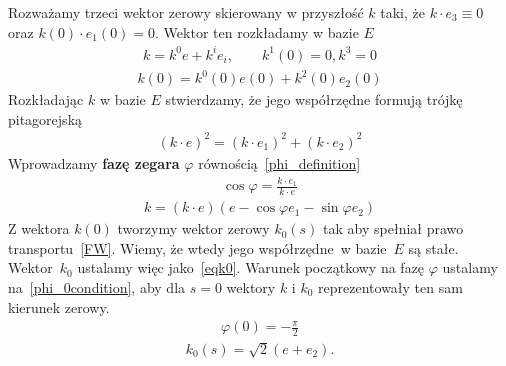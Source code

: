 Rozważamy trzeci wektor zerowy skierowany w przyszłość $k$ taki, 
że $k\cdot e_3 \equiv 0$ oraz $k(0)\cdot e_1(0) =0$.  
Wektor ten rozkładamy w bazie $E$
\begin{align*}
k = k^0 e +  k^i e_i, \qquad k^1(0)=0, k^3 = 0
\end{align*}
\begin{align*}
k(0) = k^0(0) e(0) + k^2(0) e_2(0) 
\end{align*}
Rozkładając $k$ w bazie $E$ stwierdzamy, że jego współrzędne 
formują trójkę pitagorejską 
\begin{align}
(k \cdot e)^2 = (k \cdot e_1)^2 +  (k \cdot e_2)^2
\end{align}
Wprowadzamy \textbf{fazę zegara} $\varphi$ 
równością~\eqref{phi_definition}
\begin{align}\label{phi_definition}
\cos\varphi = \frac{k\cdot e_1}{k\cdot e} 
\end{align}
\begin{align*}
k = (k\cdot e) (e -\cos\varphi e_1 - \sin\varphi e_2 )
\end{align*}
Z wektora $k(0)$ tworzymy wektor zerowy $k_0(s)$ tak aby spełniał 
prawo transportu~\eqref{FW}. Wiemy, że wtedy jego współrzędne~w 
bazie~$E$ są stałe. Wektor~$k_0$ ustalamy więc jako~\eqref{eqk0}.
Warunek początkowy na fazę $\varphi$ ustalamy 
na~\eqref{phi_0condition}, aby dla $s=0$ wektory
$k$ i $k_0$ reprezentowały ten sam kierunek zerowy.
\begin{align}\label{phi_0condition}
\varphi(0)=-\frac{\pi}{2}
\end{align}
\begin{align}\label{eqk0}
k_0(s) =  \sqrt{2} (e + e_2).
\end{align}
